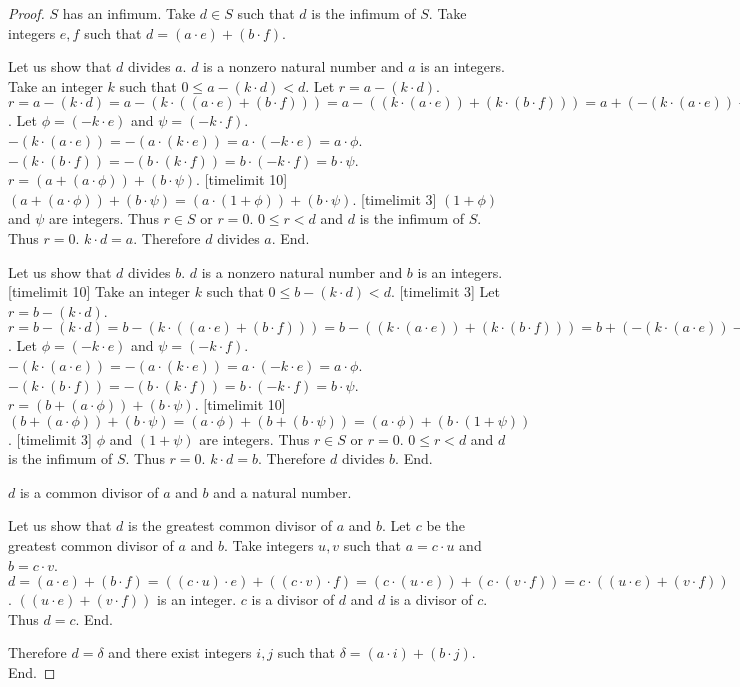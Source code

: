 \documentclass{article}
\begin{document}
\begin{forthel}
\begin{proof}
  $S$ has an infimum.
  Take $d \in S$ such that $d$ is the infimum of $S$.
  Take integers $e,f$ such that $d = (a \cdot e) + (b \cdot f)$.

  Let us show that $d$ divides $a$.
    $d$ is a nonzero natural number and $a$ is an integers.
    Take an integer $k$ such that $0 \leq a - (k \cdot d) < d$. Let $r = a - (k \cdot d)$.
    $r = a - (k \cdot d) = a - (k \cdot ((a \cdot e) + (b \cdot f)))
    = a - ((k \cdot (a \cdot e)) + (k \cdot (b \cdot f)))
    = a + (-(k \cdot (a \cdot e)) - (k \cdot (b \cdot f)))$.
    Let $\phi = (-k \cdot e)$ and $\psi = (-k \cdot f)$.
    $-(k \cdot (a \cdot e)) = -(a \cdot (k \cdot e)) = a \cdot (-k \cdot e) = a \cdot \phi$.
    $- (k \cdot (b \cdot f)) = -(b \cdot (k \cdot f)) = b \cdot (-k \cdot f) = b \cdot \psi$.
    $r = (a + (a \cdot \phi)) + (b \cdot \psi)$. [timelimit 10]
    $(a + (a \cdot \phi)) + (b \cdot \psi)= (a \cdot (1 + \phi)) + (b \cdot \psi)$. [timelimit 3]
    $(1 + \phi)$ and $\psi$ are integers. Thus $r \in S$ or $r = 0$. $0 \leq r < d$ and $d$ is the infimum of $S$.
    Thus $r = 0$. $k \cdot d = a$. Therefore $d$ divides $a$.
  End.

  Let us show that $d$ divides $b$.
    $d$ is a nonzero natural number and $b$ is an integers.
    [timelimit 10] Take an integer $k$ such that $0 \leq b - (k \cdot d) < d$. [timelimit 3] Let $r = b - (k \cdot d)$.
    $r = b - (k \cdot d) = b - (k \cdot ((a \cdot e) + (b \cdot f)))
    = b - ((k \cdot (a \cdot e)) + (k \cdot (b \cdot f)))
    = b + (-(k \cdot (a \cdot e)) - (k \cdot (b \cdot f)))$.
    Let $\phi = (-k \cdot e)$ and $\psi = (-k \cdot f)$.
    $-(k \cdot (a \cdot e)) = -(a \cdot (k \cdot e)) = a \cdot (-k \cdot e) = a \cdot \phi$.
    $- (k \cdot (b \cdot f)) = -(b \cdot (k \cdot f)) = b \cdot (-k \cdot f) = b \cdot \psi$.
    $r = (b + (a \cdot \phi)) + (b \cdot \psi)$. [timelimit 10]
    $(b + (a \cdot \phi)) + (b \cdot \psi) = (a \cdot \phi) + (b + (b \cdot \psi)) = (a \cdot \phi) + (b \cdot (1 + \psi))$. [timelimit 3]
    $\phi$ and $(1+\psi)$ are integers. Thus $r \in S$ or $r = 0$. $0 \leq r < d$ and $d$ is the infimum of $S$.
    Thus $r = 0$. $k \cdot d = b$. Therefore $d$ divides $b$.
  End.


  $d$ is a common divisor of $a$ and $b$ and a natural number.

  Let us show that $d$ is the greatest common divisor of $a$ and $b$.
    Let $c$ be the greatest common divisor of $a$ and $b$. Take integers $u,v$ such that $a = c \cdot u$ and $b = c \cdot v$.
    $d = (a \cdot e) + (b \cdot f)
    = ((c \cdot u) \cdot e) + ((c \cdot v) \cdot f)
    = (c \cdot (u \cdot e)) + (c \cdot (v \cdot f))
    = c \cdot ((u \cdot e) + (v \cdot f))$.
    $((u \cdot e) + (v \cdot f))$ is an integer. $c$ is a divisor of $d$ and $d$ is a divisor of $c$. Thus $d = c$.
  End.

  Therefore $d = \delta$ and
  there exist integers $i,j$ such that $\delta = (a \cdot i) + (b \cdot j)$.
End.
\end{proof}

\end{forthel}
\end{document}
